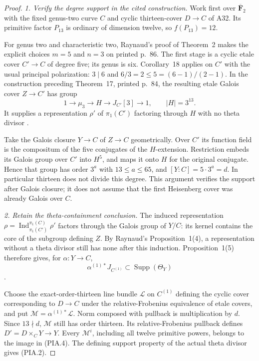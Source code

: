 \documentclass[11pt,a4paper]{article}
\begin{document}
\begin{proof}
\emph{1. Verify the degree support in the cited construction.}
Work first over $\overline{\mathbf F}_2$ with the fixed genus-two
curve $C$ and cyclic thirteen-cover $D\to C$ of A32.
Its primitive factor $P_{13}$ is ordinary of dimension twelve,
so $f(P_{13})=12$.

For genus two and characteristic two, Raynaud's proof of
Theorem~2 makes the explicit choices $m=5$ and $n=3$
on printed p.~86. The first stage is a cyclic etale cover
$C'\to C$ of degree five; its genus is six.
Corollary~18 applies on $C'$ with the usual principal
polarization: $3\mid6$ and $6/3=2\le5=(6-1)/(2-1)$.
In the construction preceding Theorem~17, printed p.~84,
the resulting etale Galois cover $Z\to C'$ has group
\[
 1\longrightarrow\mu_3\longrightarrow H
            \longrightarrow J_{C'}[3]\longrightarrow1,
                         \qquad |H|=3^{13}.
 \tag{PIA.3}
\]
It supplies a representation $\rho'$ of $\pi_1(C')$ factoring
through $H$ with no theta divisor
\cite[pp.~84--86, Theorem~17, Corollary~18 and proof of Theorem~2]{RaynaudNonordinary2000}.

Take the Galois closure $Y\to C$ of $Z\to C$ geometrically.
Over $C'$ its function field is the compositum of the five
conjugates of the $H$-extension. Restriction embeds its Galois
group over $C'$ into $H^5$, and maps it onto $H$ for the
original conjugate. Hence that group has order $3^a$ with
$13\le a\le65$, and $[Y:C]=5\cdot3^a=d$.
In particular thirteen does not divide this degree.
This argument verifies the support after Galois closure;
it does not assume that the first Heisenberg cover was
already Galois over $C$.

\emph{2. Retain the theta-containment conclusion.}
The induced representation
$\rho=\operatorname{Ind}_{\pi_1(C')}^{\pi_1(C)}\rho'$
factors through the Galois group of $Y/C$: its kernel
contains the core of the subgroup defining $Z$.
By Raynaud's Proposition~1(4), a representation without a
theta divisor still has none after this induction.
Proposition~1(5) therefore gives, for $\alpha:Y\to C$,
\[
       \alpha^{(1)*}J_{C^{(1)}}
                         \subset\operatorname{Supp}(\Theta_Y)
 \tag{PIA.4}
\]
\cite[Proposition~1(4)--(5), p.~75]{RaynaudNonordinary2000}.

Choose the exact-order-thirteen line bundle $\mathcal L$
on $C^{(1)}$ defining the cyclic cover corresponding to
$D\to C$ under the relative-Frobenius equivalence of etale
covers, and put $\mathcal M=\alpha^{(1)*}\mathcal L$.
Norm composed with pullback is multiplication by $d$.
Since $13\nmid d$, $\mathcal M$ still has order thirteen.
Its relative-Frobenius pullback defines
$D'=D\times_CY\to Y$. Every $\mathcal M^i$, including all
twelve primitive powers, belongs to the image in (PIA.4).
The defining support property of the actual theta divisor
gives (PIA.2).


\end{proof}
\end{document}
